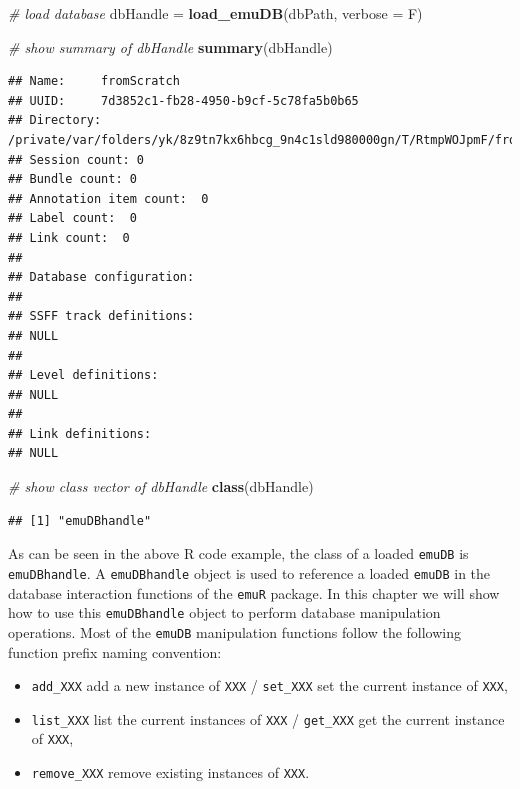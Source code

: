 \documentclass[]{book}
\newenvironment{Shaded}{\begin{snugshade}}{\end{snugshade}}
\newcommand{\CommentTok}[1]{\textcolor[rgb]{0.56,0.35,0.01}{\textit{#1}}}
\newcommand{\DataTypeTok}[1]{\textcolor[rgb]{0.13,0.29,0.53}{#1}}
\newcommand{\KeywordTok}[1]{\textcolor[rgb]{0.13,0.29,0.53}{\textbf{#1}}}
\newcommand{\NormalTok}[1]{#1}
\newcommand{\StringTok}[1]{\textcolor[rgb]{0.31,0.60,0.02}{#1}}
\providecommand{\tightlist}{%
  \setlength{\itemsep}{0pt}\setlength{\parskip}{0pt}}
\theoremstyle{definition}
\theoremstyle{definition}
\theoremstyle{definition}
\theoremstyle{remark}
\begin{document}
\begin{Shaded}
\begin{Highlighting}[]
\CommentTok{# load database}
\NormalTok{dbHandle =}\StringTok{ }\KeywordTok{load_emuDB}\NormalTok{(dbPath, }\DataTypeTok{verbose =}\NormalTok{ F)}

\CommentTok{# show summary of dbHandle}
\KeywordTok{summary}\NormalTok{(dbHandle)}
\end{Highlighting}
\end{Shaded}

\begin{verbatim}
## Name:     fromScratch 
## UUID:     7d3852c1-fb28-4950-b9cf-5c78fa5b0b65 
## Directory:    /private/var/folders/yk/8z9tn7kx6hbcg_9n4c1sld980000gn/T/RtmpWOJpmF/fromScratch_emuDB 
## Session count: 0 
## Bundle count: 0 
## Annotation item count:  0 
## Label count:  0 
## Link count:  0 
## 
## Database configuration:
## 
## SSFF track definitions:
## NULL
## 
## Level definitions:
## NULL
## 
## Link definitions:
## NULL
\end{verbatim}

\begin{Shaded}
\begin{Highlighting}[]
\CommentTok{# show class vector of dbHandle}
\KeywordTok{class}\NormalTok{(dbHandle)}
\end{Highlighting}
\end{Shaded}

\begin{verbatim}
## [1] "emuDBhandle"
\end{verbatim}

As can be seen in the above R code example, the class of a loaded
\texttt{emuDB} is \texttt{emuDBhandle}. A \texttt{emuDBhandle} object is
used to reference a loaded \texttt{emuDB} in the database interaction
functions of the \texttt{emuR} package. In this chapter we will show how
to use this \texttt{emuDBhandle} object to perform database manipulation
operations. Most of the \texttt{emuDB} manipulation functions follow the
following function prefix naming convention:

\begin{itemize}
\tightlist
\item
  \texttt{add\_XXX} add a new instance of \texttt{XXX} /
  \texttt{set\_XXX} set the current instance of \texttt{XXX},
\item
  \texttt{list\_XXX} list the current instances of \texttt{XXX} /
  \texttt{get\_XXX} get the current instance of \texttt{XXX},
\item
  \texttt{remove\_XXX} remove existing instances of \texttt{XXX}.
\end{itemize}
\end{document}
